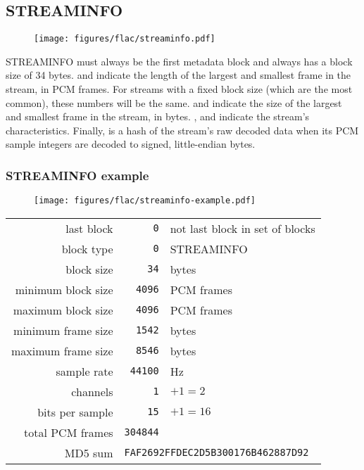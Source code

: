 \clearpage

\subsection{STREAMINFO}
\begin{figure}[h]
\texttt{[image: figures/flac/streaminfo.pdf]}
\end{figure}
\par
\noindent
STREAMINFO must always be the first metadata block and always
has a block size of 34 bytes.
 and 
indicate the length of the largest and smallest
frame in the stream, in PCM frames.
For streams with a fixed block size (which are the most common),
these numbers will be the same.
 and 
indicate the size of the largest and smallest frame in the stream,
in bytes.
,  and 
indicate the stream's characteristics.
Finally,  is a hash of the stream's raw decoded data
when its PCM sample integers are decoded to signed, little-endian bytes.

\clearpage

\subsubsection{STREAMINFO example}
\begin{figure}[h]
  \texttt{[image: figures/flac/streaminfo-example.pdf]}
\end{figure}
\begin{tabular}{rrl}
last block & \texttt{0} & not last block in set of blocks \\
block type & \texttt{0} & STREAMINFO \\
block size & \texttt{34} & bytes \\
minimum block size & \texttt{4096} & PCM frames \\
maximum block size & \texttt{4096} & PCM frames \\
minimum frame size & \texttt{1542} & bytes \\
maximum frame size & \texttt{8546} & bytes \\
sample rate & \texttt{44100} & Hz \\
channels & \texttt{1} & $+ 1 = 2$ \\
bits per sample & \texttt{15} & $+ 1 = 16$ \\
total PCM frames & \texttt{304844} & \\
MD5 sum & \multicolumn{2}{l}{\texttt{FAF2692FFDEC2D5B300176B462887D92}} \\
\end{tabular}

